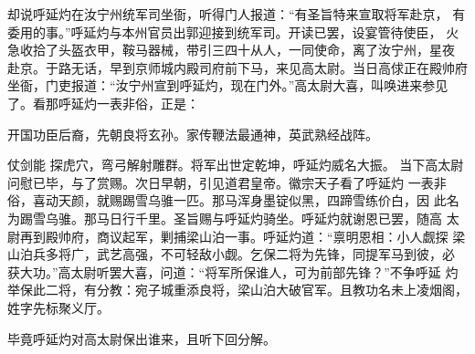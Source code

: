 却说呼延灼在汝宁州统军司坐衙，听得门人报道：“有圣旨特来宣取将军赴京，
有委用的事。”呼延灼与本州官员出郭迎接到统军司。开读已罢，设宴管待使臣，
火急收拾了头盔衣甲，鞍马器械，带引三四十从人，一同使命，离了汝宁州，星夜
赴京。于路无话，早到京师城内殿司府前下马，来见高太尉。当日高俅正在殿帅府
坐衙，门吏报道：“汝宁州宣到呼延灼，现在门外。”高太尉大喜，叫唤进来参见
了。看那呼延灼一表非俗，正是：

开国功臣后裔，先朝良将玄孙。家传鞭法最通神，英武熟经战阵。

仗剑能
探虎穴，弯弓解射雕群。将军出世定乾坤，呼延灼威名大振。
当下高太尉问慰已毕，与了赏赐。次日早朝，引见道君皇帝。徽宗天子看了呼延灼
一表非俗，喜动天颜，就赐踢雪乌骓一匹。那马浑身墨锭似黑，四蹄雪练价白，因
此名为踢雪乌骓。那马日行千里。圣旨赐与呼延灼骑坐。呼延灼就谢恩已罢，随高
太尉再到殿帅府，商议起军，剿捕梁山泊一事。呼延灼道：“禀明恩相：小人觑探
梁山泊兵多将广，武艺高强，不可轻敌小觑。乞保二将为先锋，同提军马到彼，必
获大功。”高太尉听罢大喜，问道：“将军所保谁人，可为前部先锋？”不争呼延
灼举保此二将，有分教：宛子城重添良将，梁山泊大破官军。且教功名未上凌烟阁，
姓字先标聚义厅。

毕竟呼延灼对高太尉保出谁来，且听下回分解。